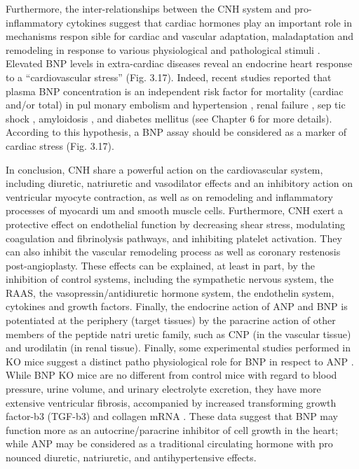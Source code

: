 \documentclass[14pt,a4paper,onecolumn]{extarticle}
\begin{document}
Furthermore, the inter-relationships between the CNH system and pro-inflammatory cytokines suggest that cardiac hormones play an important role in mechanisms respon sible for cardiac and vascular adaptation, maladaptation and remodeling in response to various physiological and pathological stimuli \citep{32} \citep{35} \citep{62} \citep{162}.  Elevated BNP levels in extra-cardiac diseases reveal an endocrine heart response to a “cardiovascular stress” (Fig. 3.17). Indeed, recent studies reported that plasma BNP concentration is an independent risk factor for mortality (cardiac and/or total) in pul monary embolism \citep{121} \citep{123} \citep{124} and hypertension \citep{127}, renal failure \citep{28} \citep{100} \citep{144}, sep tic shock \citep{145}, amyloidosis \citep{149}, and diabetes mellitus \citep{141} (see Chapter 6 for more details). According to this hypothesis, a BNP assay should be considered as a marker of cardiac stress (Fig. 3.17).

In conclusion, CNH share a powerful action on the cardiovascular system, including diuretic, natriuretic and vasodilator effects and an inhibitory action on ventricular myocyte contraction, as well as on remodeling and inflammatory processes of myocardi um and smooth muscle cells. Furthermore, CNH exert a protective effect on endothelial function by decreasing shear stress, modulating coagulation and fibrinolysis pathways, and inhibiting platelet activation. They can also inhibit the vascular remodeling process as well as coronary restenosis post-angioplasty. These effects can be explained, at least in part, by the inhibition of control systems, including the sympathetic nervous system, the RAAS, the vasopressin/antidiuretic hormone system, the endothelin system, cytokines and growth factors. Finally, the endocrine action of ANP and BNP is potentiated at the periphery (target tissues) by the paracrine action of other members of the peptide natri uretic family, such as CNP (in the vascular tissue) and urodilatin (in renal tissue).  Finally, some experimental studies performed in KO mice suggest a distinct patho physiological role for BNP in respect to ANP \citep{18}. While BNP KO mice are no different from control mice with regard to blood pressure, urine volume, and urinary electrolyte excretion, they have more extensive ventricular fibrosis, accompanied by increased transforming growth factor-b3 (TGF-b3) and collagen mRNA \citep{18}. These data suggest that BNP may function more as an autocrine/paracrine inhibitor of cell growth in the heart; while ANP may be considered as a traditional circulating hormone with pro nounced diuretic, natriuretic, and antihypertensive effects.
\end{document}
